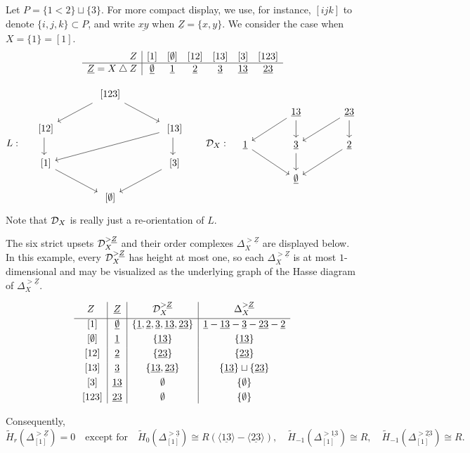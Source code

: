 \documentclass[a4paper,leqno]{amsart}
\begin{document}
\begin{eg}\label{subsec:eg1}
Let $P=\{1<2\}\sqcup\{3\}$.  For more compact display, we use, for instance, $[ijk]$ to denote $\{i,j,k\}\subset P$, and write $\underline{xy}$ when $\underline{Z}=\{x,y\}$. We consider the case when $X=\{1\}=[1]$.
\[
\begin{array}{r|cccccc}
 Z&[1]&[\emptyset]&[12]&[13]&[3]&[123]\\ \hline
 \underline{Z} = X\mathbin{\triangle} Z&\underline{\emptyset}&\underline{1}&\underline{2}&\underline{3}&\underline{13}&\underline{23}
\end{array}
\]

\[
L: \quad \begin{tikzcd}[column sep=large]
 & \ [123]\ar[ld]\ar[rd] & \\
\ [12] \ar[d] & & \ [13] \ar[d]\ar[lld] \\
\ [1] \ar[rd] & & \ [3] \ar[ld] \\
& \ [\emptyset] &
\end{tikzcd} \qquad
\D_X: \quad \begin{tikzcd}[column sep=large]
 & \underline{13}\ar[ld]\ar[d] & \underline{23}\ar[d]\ar[dl] \\
 \underline{1}\ar[rd] & \underline{3}\ar[d] & \underline{2}\ar[ld] \\
 & \underline{\emptyset} &
\end{tikzcd}
\]
Note that $\mathcal D_X$ is really just a re-orientation of $L$.

The six strict upsets $\mathcal D_X^{>\underline{Z}}$ and their order complexes $\Delta_X^{>\underline{Z}}$ are displayed below. In this example, every $\mathcal D_X^{>\underline{Z}}$ has height at most one, so each $\Delta_X^{>\underline{Z}}$ is at most $1$-dimensional and may be visualized as the underlying graph of the Hasse diagram of $\Delta_X^{> \underline{Z}}$.

\[
\begin{array}{c|c|c|c}
 Z& \underline{Z} & \mathcal D_X^{>\underline{Z}}&\Delta_X^{>\underline{Z}}\\[1mm] \hline
 \ [1]&\underline{\emptyset} &\{\underline{1},\underline{2},\underline{3},\underline{13},\underline{23}\}&
 \underline{1}-\underline{13}-\underline{3}-\underline{23}-\underline{2}\\[1mm]
 \ [\emptyset]& \underline{1}&\{\underline{13}\}& \{\underline{13}\} \\[1mm]
 \ [12]& \underline{2}&\{\underline{23}\}& \{\underline{23}\} \\[1mm]
 \ [13]& \underline{3}&\{\underline{13}, \underline{23}\}&  \{\underline{13}\}\sqcup\{\underline{23}\}\\[1mm]
 \ [3]& \underline{13}&{\emptyset}&\{\emptyset\}\\[1mm]
 \ [123]& \underline{23}&{\emptyset}&\{\emptyset\}
\end{array}
\]

Consequently,
\[
 \widetilde H_r(\Delta^{>\underline{Z}}_{[1]})=0
 \quad\text{except for}\quad
 \widetilde H_0(\Delta^{>\underline{3}}_{[1]})\cong R(\langle \underline{13}\rangle -  \langle\underline{23}\rangle),
 \quad
 \widetilde H_{-1}(\Delta^{>\underline{13}}_{[1]})\cong R,
 \quad
 \widetilde H_{-1}(\Delta^{>\underline{23}}_{[1]})\cong R.
\]
\end{eg}
\end{document}
